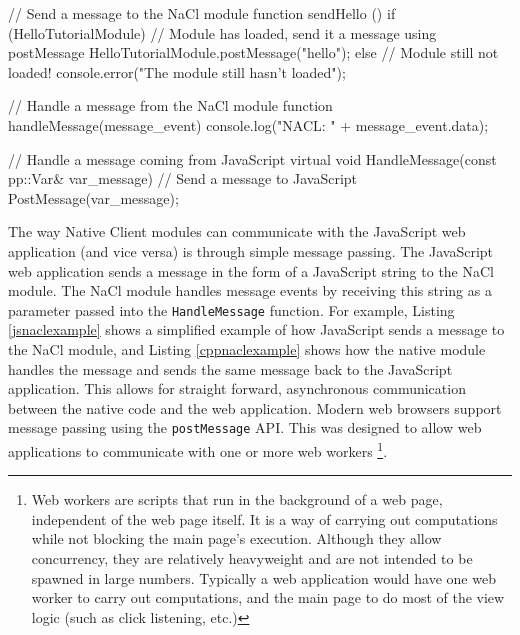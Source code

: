 \begin{code}
// Send a message to the NaCl module
function sendHello () {
  if (HelloTutorialModule) {
    // Module has loaded, send it a message using postMessage
    HelloTutorialModule.postMessage("hello");
  } else {
    // Module still not loaded!
    console.error("The module still hasn't loaded");
  }
}

// Handle a message from the NaCl module
function handleMessage(message_event) {
  console.log("NACL: " + message_event.data);
}
\end{code}


\begin{code}
// Handle a message coming from JavaScript
virtual void HandleMessage(const pp::Var& var_message) {
  // Send a message to JavaScript
  PostMessage(var_message);
}
\end{code}

The way Native Client modules can communicate with the JavaScript web application (and vice versa) is through simple message passing. The JavaScript web application sends a message in the form of a JavaScript string to the NaCl module. The NaCl module handles message events by receiving this string as a parameter passed into the \lstinline+HandleMessage+ function. For example, Listing \ref{jsnaclexample} shows a simplified example of how JavaScript sends a message to the NaCl module, and Listing \ref{cppnaclexample} shows how the native module handles the message and sends the same message back to the JavaScript application. This allows for straight forward, asynchronous communication between the native code and the web application. Modern web browsers support message passing using the \lstinline+postMessage+ API. This was designed to allow web applications to communicate with one or more web workers
\footnote{Web workers\cite{webworkersw3c} are scripts that run in the background of a web page, independent of the web page itself. It is a way of carrying out computations while not blocking the main page's execution. Although they allow concurrency, they are relatively heavyweight and are not intended to be spawned in large numbers. Typically a web application would have one web worker to carry out computations, and the main page to do most of the view logic (such as click listening, etc.)}. 


